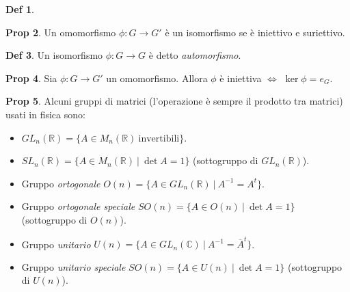 \documentclass[]{article}
\theoremstyle{definition}
\theoremstyle{definition}
\newtheorem{prop}{Prop}[subsection]
\theoremstyle{definition}
\newtheorem{dfn}[prop]{Def}
\begin{document}
\begin{dfn}
 \end{dfn} \begin{prop} Un omomorfismo $\phi : G \to G'$ è un isomorfismo se è iniettivo e suriettivo.

\end{prop}  \begin{dfn} Un isomorfismo $\phi : G \to G$ è detto \emph{automorfismo}.

 \end{dfn} \begin{prop} Sia $\phi : G \to G'$ un omomorfismo. Allora $\phi$ è iniettiva $\Leftrightarrow$ $\ker \phi = e_G$.

\end{prop} \begin{prop} Alcuni gruppi di matrici (l'operazione è sempre il prodotto tra matrici) usati in fisica sono:
\begin{itemize}
\item $GL_n (\mathbb{R})= \{ A \in M_n (\mathbb{R}) \ \mathrm{invertibili} \}$.
\item $SL_n (\mathbb{R})= \{ A \in M_n (\mathbb{R}) \ | \ \det A =1 \}$ (sottogruppo di $GL_n (\mathbb{R})$).
\item Gruppo \emph{ortogonale} $O(n) = \{ A \in GL_n (\mathbb{R}) \ | \ A^{-1}=A^t \}$.
\item Gruppo \emph{ortogonale speciale} $SO(n) = \{ A \in O(n) \ | \ \det A =1 \}$ (sottogruppo di $O(n)$).
\item Gruppo \emph{unitario} $U(n)= \{ A \in GL_n (\mathbb{C}) \ | \ A^{-1}=\overline{A}^t \}$.
\item Gruppo \emph{unitario speciale} $SO(n) = \{ A \in U(n) \ | \ \det A =1 \}$ (sottogruppo di $U(n)$).
\end{itemize}
\end{prop}
 
\end{document}
